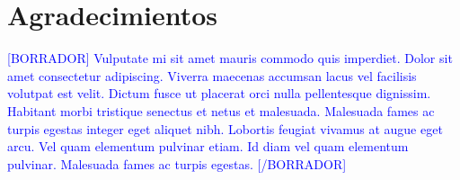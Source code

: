 
\newpage
\clearpage{\pagestyle{empty}\cleardoublepage}
\newpage

\chapter*{\centering \large Agradecimientos}

\textcolor{blue}{[BORRADOR] Vulputate mi sit amet mauris commodo quis imperdiet. Dolor sit amet consectetur adipiscing. Viverra maecenas accumsan lacus vel facilisis volutpat est velit. Dictum fusce ut placerat orci nulla pellentesque dignissim. Habitant morbi tristique senectus et netus et malesuada. Malesuada fames ac turpis egestas integer eget aliquet nibh. Lobortis feugiat vivamus at augue eget arcu. Vel quam elementum pulvinar etiam. Id diam vel quam elementum pulvinar. Malesuada fames ac turpis egestas. [/BORRADOR]}